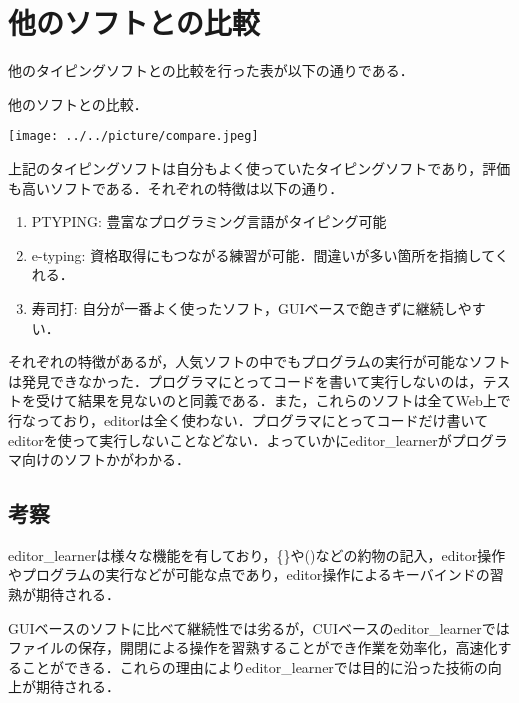 \chapter{他のソフトとの比較}\label{ux4ed6ux306eux30bdux30d5ux30c8ux3068ux306eux6bd4ux8f03}
他のタイピングソフトとの比較を行った表が以下の通りである．

\begin{table}[H]
\centering
\begin{center}
\caption{他のソフトとの比較．\label{compare}}
\texttt{[image: ../../picture/compare.jpeg]}
\end{center}

\label{fig:}
\end{table}

上記のタイピングソフトは自分もよく使っていたタイピングソフトであり，評価も高いソフトである．それぞれの特徴は以下の通り．

\begin{enumerate}
\def\labelenumi{\arabic{enumi}.}
\tightlist
\item
PTYPING: 豊富なプログラミング言語がタイピング可能
\item
e-typing: 資格取得にもつながる練習が可能．間違いが多い箇所を指摘してくれる．
\item
寿司打: 自分が一番よく使ったソフト，GUIベースで飽きずに継続しやすい．
\end{enumerate}

それぞれの特徴があるが，人気ソフトの中でもプログラムの実行が可能なソフトは発見できなかった．プログラマにとってコードを書いて実行しないのは，テストを受けて結果を見ないのと同義である．また，これらのソフトは全てWeb上で行なっており，editorは全く使わない．プログラマにとってコードだけ書いてeditorを使って実行しないことなどない．よっていかにeditor\_learnerがプログラマ向けのソフトかがわかる．

\section{考察}\label{ux8003ux5bdf}

editor\_learnerは様々な機能を有しており，\{\}や()などの約物の記入，editor操作やプログラムの実行などが可能な点であり，editor操作によるキーバインドの習熟が期待される．

GUIベースのソフトに比べて継続性では劣るが，CUIベースのeditor\_learnerではファイルの保存，開閉による操作を習熟することができ作業を効率化，高速化することができる．これらの理由によりeditor\_learnerでは目的に沿った技術の向上が期待される．

    
